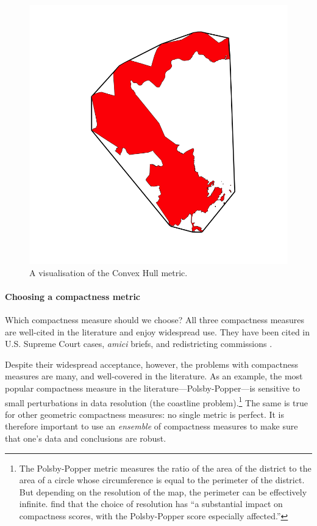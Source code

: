 \documentclass[]{article}
\let\oldparagraph\paragraph
\renewcommand{\paragraph}[1]{\oldparagraph{#1}\mbox{}}
\begin{document}
\begin{figure}
\centering
\includegraphics{img/ch.png}
\caption{A visualisation of the Convex Hull metric.}
\end{figure}

\hypertarget{choosing-a-compactness-metric}{%
\paragraph{Choosing a compactness
metric}\label{choosing-a-compactness-metric}}

Which compactness measure should we choose? All three compactness
measures are well-cited in the literature and enjoy widespread use. They
have been cited in U.S. Supreme Court cases, \emph{amici} briefs, and
redistricting commissions \citep{moncrief2011}.

Despite their widespread acceptance, however, the problems with
compactness measures are many, and well-covered in the literature. As an
example, the most popular compactness measure in the
literature---Polsby-Popper---is sensitive to small perturbations in data
resolution (the coastline problem).\footnote{The Polsby-Popper metric
  measures the ratio of the area of the district to the area of a circle
  whose circumference is equal to the perimeter of the district. But
  depending on the resolution of the map, the perimeter can be
  effectively infinite. \citeauthor{bswp} find that the choice of
  resolution has ``a substantial impact on compactness scores, with the
  Polsby-Popper score especially affected.''} The same is true for other
geometric compactness measures: no single metric is perfect. It is
therefore important to use an \emph{ensemble} of compactness measures to
make sure that one's data and conclusions are robust.
\end{document}
